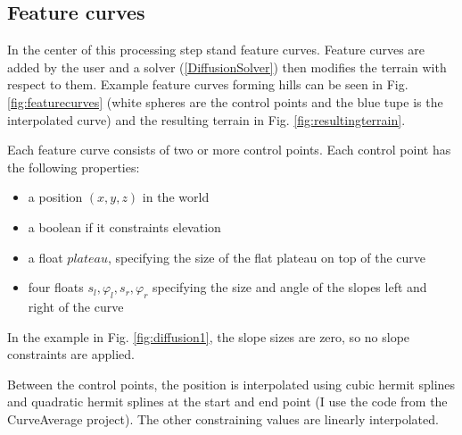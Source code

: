 \documentclass[journal, letterpaper]{IEEEtran}
\begin{document}
\subsection{Feature curves}
In the center of this processing step stand feature curves. Feature curves are added by the user and a solver (\ref{DiffusionSolver}) then modifies the terrain with respect to them.
Example feature curves forming hills can be seen in Fig. \ref{fig:featurecurves} (white spheres are the control points and the blue tupe is the interpolated curve) and the resulting terrain in Fig. \ref{fig:resultingterrain}.

Each feature curve consists of two or more control points. Each control point has the following properties:
\begin{itemize}
	\item a position $(x,y,z)$ in the world
	\item a boolean if it constraints elevation
	\item a float $plateau$, specifying the size of the flat plateau on top of the curve
	\item four floats $s_l, \varphi_l, s_r, \varphi_r$ specifying the size and angle of the slopes left and right of the curve
\end{itemize}
In the example in Fig. \ref{fig:diffusion1}, the slope sizes are zero, so no slope constraints are applied.

Between the control points, the position is interpolated using cubic hermit splines and quadratic hermit splines at the start and end point (I use the code from the CurveAverage project).
The other constraining values are linearly interpolated. 
\end{document}
